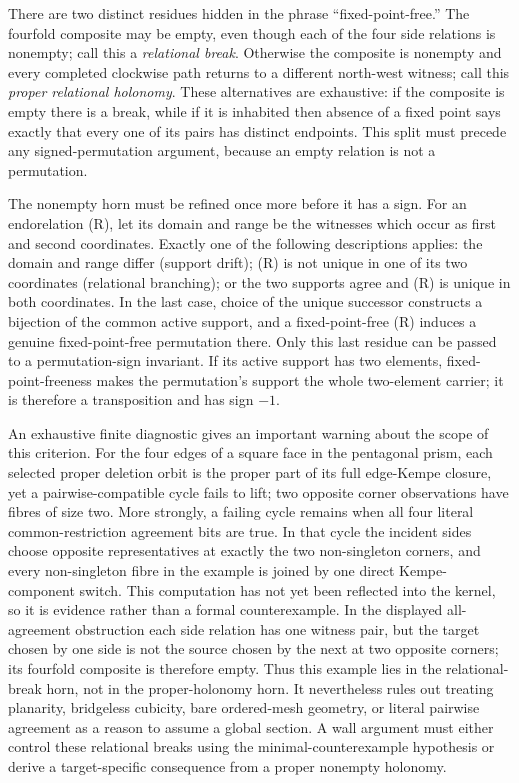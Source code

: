 There are two distinct residues hidden in the phrase ``fixed-point-free.''
The fourfold composite may be empty, even though each of the four side
relations is nonempty; call this a \emph{relational break}.  Otherwise the
composite is nonempty and every completed clockwise path returns to a
different north-west witness; call this \emph{proper relational holonomy}.
These alternatives are exhaustive: if the composite is empty there is a
break, while if it is inhabited then absence of a fixed point says exactly
that every one of its pairs has distinct endpoints.  This split must precede
any signed-permutation argument, because an empty relation is not a
permutation.

The nonempty horn must be refined once more before it has a sign.  For an
endorelation (R), let its domain and range be the witnesses which occur as
first and second coordinates.  Exactly one of the following descriptions
applies: the domain and range differ (support drift); (R) is not unique in
one of its two coordinates (relational branching); or the two supports agree
and (R) is unique in both coordinates.  In the last case, choice of the
unique successor constructs a bijection of the common active support, and a
fixed-point-free (R) induces a genuine fixed-point-free permutation there.
Only this last residue can be passed to a permutation-sign invariant.  If its
active support has two elements, fixed-point-freeness makes the permutation's
support the whole two-element carrier; it is therefore a transposition and
has sign \(-1\).

An exhaustive finite diagnostic gives an important warning about the scope of
this criterion.  For the four edges of a square face in the pentagonal prism,
each selected proper deletion orbit is the proper part of its full edge-Kempe
closure, yet a pairwise-compatible cycle fails to lift; two opposite corner
observations have fibres of size two.  More strongly, a failing cycle remains
when all four literal common-restriction agreement bits are true.  In that
cycle the incident sides choose opposite representatives at exactly the two
non-singleton corners, and every non-singleton fibre in the example is joined
by one direct Kempe-component switch.  This computation has not yet been
reflected into the kernel, so it is evidence rather than a formal
counterexample.  In the displayed all-agreement obstruction each side
relation has one witness pair, but the target chosen by one side is not the
source chosen by the next at two opposite corners; its fourfold composite is
therefore empty.  Thus this example lies in the relational-break horn, not in
the proper-holonomy horn.  It nevertheless rules out treating planarity,
bridgeless cubicity, bare ordered-mesh geometry, or literal pairwise agreement
as a reason to assume a global section.  A wall argument must either control these
relational breaks using the minimal-counterexample hypothesis or derive a
target-specific consequence from a proper nonempty holonomy.

